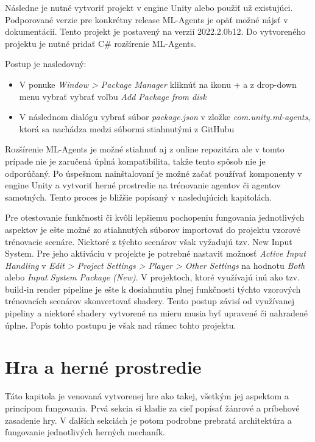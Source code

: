 \documentclass[slovak, master]{diploma}
\begin{document}
Následne je nutné vytvoriť projekt v engine Unity alebo použiť už existujúci. Podporované verzie pre konkrétny release ML-Agents je opäť možné nájsť v dokumentácií. Tento projekt je postavený na verzií 2022.2.0b12. Do vytvoreného projektu je nutné pridať C\# rozšírenie ML-Agents. 

Postup je nasledovný: 
\begin{itemize}
  \item V ponuke \textit{Window > Package Manager} kliknúť na ikonu + a z drop-down menu vybrať vybrať voľbu \textit{Add Package from disk}
  \item V následnom dialógu vybrať súbor \textit{package.json} v zložke \textit{com.unity.ml-agents}, ktorá sa nachádza medzi súbormi stiahnutými z GitHubu
\end{itemize}

Rozšírenie ML-Agents je možné stiahnuť aj z online repozitára ale v tomto prípade nie je zaručená úplná kompatibilita, takže tento spôsob nie je odporúčaný. Po úspešnom nainštalovaní je možné začať používať komponenty v engine Unity a vytvoriť herné prostredie na trénovanie agentov či agentov samotných. Tento proces je bližšie popísaný v nasledujúcich kapitolách. 

Pre otestovanie funkčnosti či kvôli lepšiemu pochopeniu fungovania jednotlivých aspektov je ešte možné zo stiahnutých súborov importovať do projektu vzorové trénovacie scenáre. Niektoré z týchto scenárov však vyžadujú tzv. New Input System. Pre jeho aktiváciu v projekte je potrebné nastaviť možnosť \textit{Active Input Handling} v \textit{Edit > Project Settings > Player > Other Settings} na hodnotu \textit{Both} alebo \textit{Input System Package (New)}. V projektoch, ktoré využívajú inú ako tzv. build-in render pipeline je ešte k dosiahnutiu plnej funkčnosti týchto vzorových trénovacích scenárov skonvertovať shadery. Tento postup závisí od využívanej pipeliny a niektoré shadery vytvorené na mieru musia byť upravené či nahradené úplne. Popis tohto postupu je však nad rámec tohto projektu.

\chapter{Hra a herné prostredie}
\label{sec:GameOverview}
Táto kapitola je venovaná vytvorenej hre ako takej, všetkým jej aspektom a princípom fungovania. Prvá sekcia si kladie za cieľ popísať žánrové a príbehové zasadenie hry. V ďalších sekciách je potom podrobne prebratá architektúra a fungovanie jednotlivých herných mechaník.
\end{document}
